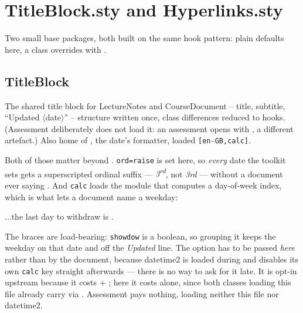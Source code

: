 \section{TitleBlock.sty and Hyperlinks.sty}\label{sec:ref-titleblock}

Two small base packages, both built on the same hook pattern: plain
defaults here, a class overrides with .

\subsection*{TitleBlock}

The shared title block for LectureNotes and CourseDocument -- title,
subtitle, ``Updated $\langle$date$\rangle$'' -- structure written once,
class differences reduced to hooks. (Assessment deliberately does not load
it: an assessment opens with , a different artefact.)
Also home of , the date's formatter, loaded
\texttt{[en-GB,calc]}.

Both of those matter beyond . \texttt{ord=raise} is set here, so
\emph{every} date the toolkit sets gets a superscripted ordinal suffix ---
\emph{3\textsuperscript{rd}}, not \emph{3rd} --- without a document ever
saying . And \texttt{calc} loads the module that
computes a day-of-week index, which is what lets a document name a weekday:

\begin{manexsource}
...the last day to withdraw is
  {}.   %
\end{manexsource}

The braces are load-bearing: \texttt{showdow} is a boolean, so grouping it
keeps the weekday on that date and off the \emph{Updated} line. The option
has to be passed \emph{here} rather than by the document, because datetime2
is loaded during  and disables its own \texttt{calc} key
straight afterwards --- there is no way to ask for it late. It is opt-in
upstream because it costs  $+$ ; here it
costs  alone, since both classes loading this file already
carry  via . Assessment pays nothing, loading
neither this file nor datetime2.


